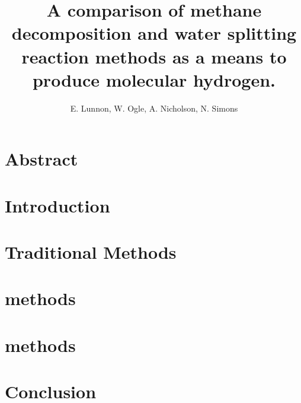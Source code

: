 \documentclass[a4paper]{article}
\title{A comparison of methane decomposition and water splitting reaction methods as a means to produce molecular hydrogen.}
\author{E. Lunnon, W. Ogle, A. Nicholson, N. Simons}
\begin{document}
\maketitle
\begin{multicols}{2}
\tableofcontents

\section*{Abstract}%
\label{sec:abstract}



\section{Introduction}%
\label{sec:introduction}


\section{Traditional Methods}%
\label{sub:Traditional_Methods}


\section{ methods}%
\label{sub:ch4_methods}


\section{ methods}%
\label{sub:h2o_methods}


\section{Conclusion}%
\label{sec:conclusion}


%



\end{multicols}
\end{document}
